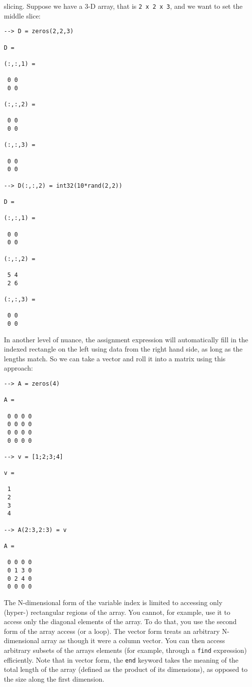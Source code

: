 slicing.  Suppose we have a 3-D array, that is \verb|2 x 2 x 3|,
and we want to set the middle slice:
\begin{verbatim}
--> D = zeros(2,2,3)

D = 

(:,:,1) = 

 0 0 
 0 0 

(:,:,2) = 

 0 0 
 0 0 

(:,:,3) = 

 0 0 
 0 0 

--> D(:,:,2) = int32(10*rand(2,2))

D = 

(:,:,1) = 

 0 0 
 0 0 

(:,:,2) = 

 5 4 
 2 6 

(:,:,3) = 

 0 0 
 0 0 
\end{verbatim}
In another level of nuance, the assignment expression will
automatically fill in the indexed rectangle on the left using
data from the right hand side, as long as the lengths match.
So we can take a vector and roll it into a matrix using this
approach:
\begin{verbatim}
--> A = zeros(4)

A = 

 0 0 0 0 
 0 0 0 0 
 0 0 0 0 
 0 0 0 0 

--> v = [1;2;3;4]

v = 

 1 
 2 
 3 
 4 

--> A(2:3,2:3) = v

A = 

 0 0 0 0 
 0 1 3 0 
 0 2 4 0 
 0 0 0 0 
\end{verbatim}

The N-dimensional form of the variable index is limited
to accessing only (hyper-) rectangular regions of the 
array.  You cannot, for example, use it to access only
the diagonal elements of the array.  To do that, you use
the second form of the array access (or a loop).  The
vector form treats an arbitrary N-dimensional array as though
it were a column vector.  You can then access arbitrary 
subsets of the arrays elements (for example, through a \verb|find|
expression) efficiently.  Note that in vector form, the \verb|end|
keyword takes the meaning of the total length of the array
(defined as the product of its dimensions), as opposed to the
size along the first dimension.
